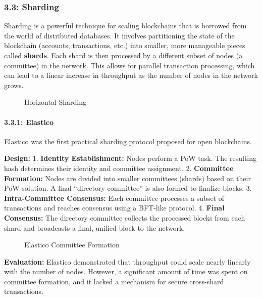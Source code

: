 \subsubsection{3.3: Sharding}\label{sharding}

Sharding is a powerful technique for scaling blockchains that is
borrowed from the world of distributed databases. It involves
partitioning the state of the blockchain (accounts, transactions, etc.)
into smaller, more manageable pieces called \textbf{shards}. Each shard
is then processed by a different subset of nodes (a committee) in the
network. This allows for parallel transaction processing, which can lead
to a linear increase in throughput as the number of nodes in the network
grows.

\begin{figure}
\centering
\caption{Horizontal Sharding}
\end{figure}

\paragraph{3.3.1: Elastico}\label{elastico}

Elastico was the first practical sharding protocol proposed for open
blockchains.

\textbf{Design:} 1. \textbf{Identity Establishment:} Nodes perform a PoW
task. The resulting hash determines their identity and committee
assignment. 2. \textbf{Committee Formation:} Nodes are divided into
smaller committees (shards) based on their PoW solution. A final
``directory committee'' is also formed to finalize blocks. 3.
\textbf{Intra-Committee Consensus:} Each committee processes a subset of
transactions and reaches consensus using a BFT-like protocol. 4.
\textbf{Final Consensus:} The directory committee collects the processed
blocks from each shard and broadcasts a final, unified block to the
network.

\begin{figure}
\centering
\caption{Elastico Committee Formation}
\end{figure}

\textbf{Evaluation:} Elastico demonstrated that throughput could scale
nearly linearly with the number of nodes. However, a significant amount
of time was spent on committee formation, and it lacked a mechanism for
secure cross-shard transactions.

